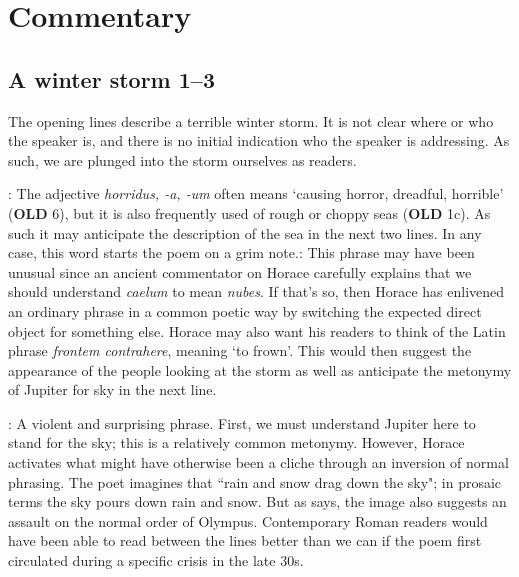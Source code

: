\chapter*{Commentary}

\section*{A winter storm 1--3}

The opening lines describe a terrible winter storm.  It is not clear where or who the speaker is, and there is no initial indication who the speaker is addressing.  As such, we are plunged into the storm ourselves as readers.


: The adjective \textit{horridus, -a, -um} often means `causing horror, dreadful, horrible' (\textbf{OLD} 6), but it is also frequently used of rough or choppy seas (\textbf{OLD} 1c).  As such it may anticipate the description of the sea in the next two lines.  In any case, this word starts the poem on a grim note.\indent{}: This phrase may have been unusual since an ancient commentator on Horace carefully explains that we should understand \textit{caelum} to mean \textit{nubes}.  If that's so, then Horace has enlivened an ordinary phrase in a common poetic way by switching the expected direct object for something else.  Horace may also want his readers to think of the Latin phrase \textit{frontem contrahere}, meaning `to frown'.  This would then suggest the appearance of the people looking at the storm as well as anticipate the metonymy of Jupiter for sky in the next line.  


: A violent and surprising phrase.  First, we must understand Jupiter here to stand for the sky; this is a relatively common metonymy.  However, Horace activates what might have otherwise been a cliche through an inversion of normal phrasing.  The poet imagines that  ``rain and snow drag down the sky"; in prosaic terms the sky pours down rain and snow.  But as \citet[215]{mankin1995} says, the image also suggests an assault on the normal order of Olympus.  Contemporary Roman readers would have been able to read between the lines better than we can if the poem first circulated during a specific crisis in the late 30s.


